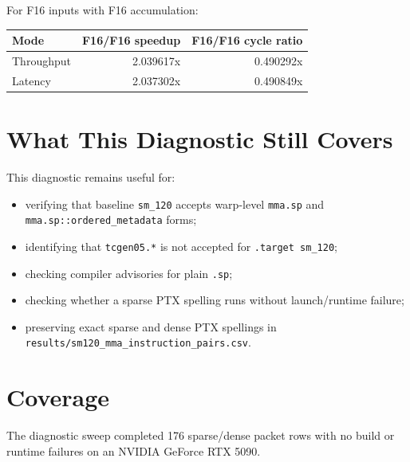 \documentclass[10pt]{article}
\begin{document}
For F16 inputs with F16 accumulation:

\begin{center}
\small
\begin{tabular}{lrr}
\toprule
Mode & F16/F16 speedup & F16/F16 cycle ratio \\
\midrule
Throughput & 2.039617x & 0.490292x \\
Latency & 2.037302x & 0.490849x \\
\bottomrule
\end{tabular}
\end{center}

\section{What This Diagnostic Still Covers}

This diagnostic remains useful for:

\begin{itemize}
\item verifying that baseline \texttt{sm\_120} accepts warp-level
\texttt{mma.sp} and \texttt{mma.sp::ordered\_metadata} forms;
\item identifying that \texttt{tcgen05.*} is not accepted for
\texttt{.target sm\_120};
\item checking compiler advisories for plain \texttt{.sp};
\item checking whether a sparse PTX spelling runs without launch/runtime
failure;
\item preserving exact sparse and dense PTX spellings in
\texttt{results/sm120\_mma\_instruction\_pairs.csv}.
\end{itemize}

\section{Coverage}

The diagnostic sweep completed 176 sparse/dense packet rows with no build or
runtime failures on an NVIDIA GeForce RTX 5090.
\end{document}
